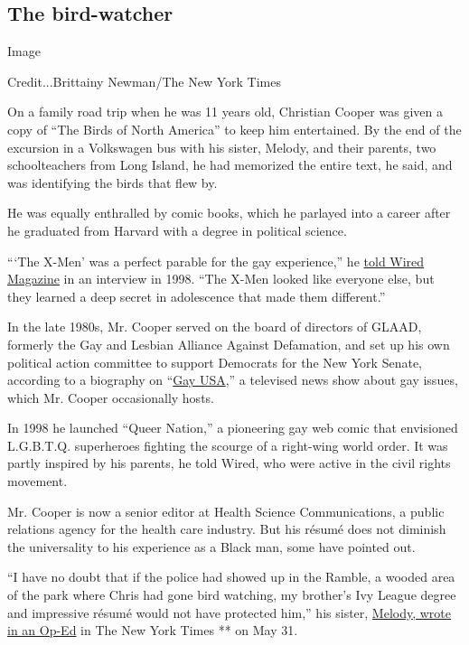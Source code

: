 \hypertarget{the-bird-watcher}{%
\subsection{The bird-watcher}\label{the-bird-watcher}}

Image

Credit...Brittainy Newman/The New York Times

On a family road trip when he was 11 years old, Christian Cooper was
given a copy of ``The Birds of North America'' to keep him entertained.
By the end of the excursion in a Volkswagen bus with his sister, Melody,
and their parents, two schoolteachers from Long Island, he had memorized
the entire text, he said, and was identifying the birds that flew by.

He was equally enthralled by comic books, which he parlayed into a
career after he graduated from Harvard with a degree in political
science.

```The X-Men' was a perfect parable for the gay experience,'' he
\href{https://www.wired.com/1998/12/can-miss-thang-save-earth/?fbclid=IwAR3iEjyOmx-OGot3VBzWzcUVRvey1E7nKano-bHvLn4wi_QHX5zfWK28B4E}{told
Wired Magazine} in an interview in 1998. ``The X-Men looked like
everyone else, but they learned a deep secret in adolescence that made
them different.''

In the late 1980s, Mr. Cooper served on the board of directors of GLAAD,
formerly the Gay and Lesbian Alliance Against Defamation, and set up his
own political action committee to support Democrats for the New York
Senate, according to a biography on
``\href{http://gayusatv.org/chris-cooper/?fbclid=IwAR3vZj4cMWhBjhY8aYthS2C1yapBYQiazkpQrwUs7R0E-iqyK8GWrM18E3w}{Gay
USA},'' a televised news show about gay issues, which Mr. Cooper
occasionally hosts.

In 1998 he launched ``Queer Nation,'' a pioneering gay web comic that
envisioned L.G.B.T.Q. superheroes fighting the scourge of a right-wing
world order. It was partly inspired by his parents, he told Wired, who
were active in the civil rights movement.

Mr. Cooper is now a senior editor at Health Science Communications, a
public relations agency for the health care industry. But his résumé
does not diminish the universality to his experience as a Black man,
some have pointed out.

``I have no doubt that if the police had showed up in the Ramble, a
wooded area of the park where Chris had gone bird watching, my brother's
Ivy League degree and impressive résumé would not have protected him,''
his sister,
\href{https://www.nytimes3xbfgragh.onion/2020/05/31/opinion/chris-cooper-central-park.html?smtyp=cur\&smid=tw-nytimes}{Melody,
wrote in an Op-Ed} in The New York Times ** on May 31.

